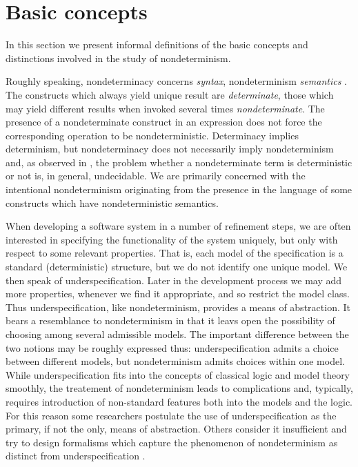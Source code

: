 \section{Basic concepts}\label{se:one}
In this section we present informal 
definitions of the basic concepts and distinctions involved in the 
study of nondeterminism. 

 Roughly speaking, nondeterminacy 
concerns {\em syntax}, nondeterminism {\em semantics} \cite{c:21}. The constructs 
which always yield unique result are {\em determinate}, those which 
may yield different results when invoked several times 
{\em non\-deter\-minate}. The presence of a 
nondetermi\-nate construct in an expression does not force the 
cor\-re\-sponding operation to be nondetermin\-istic. Determinacy implies 
determinism, but nonde\-terminacy does not necessarily imply 
non\-deter\-minism and, as observed in \cite{c:18}, the problem whether a 
non\-determinate term is deter\-mi\-nistic or not is, in general, undecidable. 
We are primarily concerned with the intentional 
nondeterminism originating from the presence in the language of some 
constructs which have nondeterministic semantics. 

When developing a software system 
in a number of refinement steps, we are often interested in 
specifying the functionality of the system uniquely, but only with 
respect to some relevant properties. 
That is, each model of the specification is a standard 
(deterministic) structure, but we do not identify one unique model. We 
then speak of underspecification. Later in the development process we 
may add more properties, whenever we find it appropriate, 
and so restrict the model class. Thus underspecification,
like nondeterminism, provides a means of abstraction. It 
bears a resemblance to nondeterminism in that it leavs open the 
possibility of choosing among several admissible models. The 
important difference between the two notions may be roughly expressed 
thus: underspecification admits a choice between different models, but 
nondeterminism admits choices within one model. While 
underspecification fits into the concepts of classical logic and 
model theory smoothly, the treatement of nondeterminism leads to 
complications and, typically, requires introduction of non-standard 
features both into the models and the logic. For this reason some 
researchers postulate the use of underspecification as the 
primary, if not the only, means of abstraction. Others consider it 
insufficient and try to design formalisms which capture the 
phenomenon of nondeterminism as distinct from underspecification 
\cite{c:LR, c:94, c:118, c:132}.

